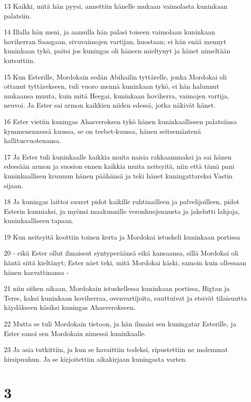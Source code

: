 \par 13 Kaikki, mitä hän pyysi, annettiin hänelle mukaan vaimolasta kuninkaan palatsiin.
\par 14 Illalla hän meni, ja aamulla hän palasi toiseen vaimolaan kuninkaan hoviherran Saasgaan, sivuvaimojen vartijan, huostaan; ei hän enää mennyt kuninkaan tykö, paitsi jos kuningas oli häneen mieltynyt ja hänet nimeltään kutsuttiin.
\par 15 Kun Esterille, Mordokain sedän Abihailin tyttärelle, jonka Mordokai oli ottanut tyttärekseen, tuli vuoro mennä kuninkaan tykö, ei hän halunnut mukaansa muuta, kuin mitä Heegai, kuninkaan hoviherra, vaimojen vartija, neuvoi. Ja Ester sai armon kaikkien niiden edessä, jotka näkivät hänet.
\par 16 Ester vietiin kuningas Ahasveroksen tykö hänen kuninkaalliseen palatsiinsa kymmenennessä kuussa, se on teebet-kuussa, hänen seitsemäntenä hallitusvuotenansa.
\par 17 Ja Ester tuli kuninkaalle kaikkia muita naisia rakkaammaksi ja sai hänen edessään armon ja suosion ennen kaikkia muita neitsyitä, niin että tämä pani kuninkaallisen kruunun hänen päähänsä ja teki hänet kuningattareksi Vastin sijaan.
\par 18 Ja kuningas laittoi suuret pidot kaikille ruhtinailleen ja palvelijoilleen, pidot Esterin kunniaksi, ja myönsi maakunnille veronhuojennusta ja jakelutti lahjoja, kuninkaalliseen tapaan.
\par 19 Kun neitsyitä koottiin toinen kerta ja Mordokai istuskeli kuninkaan portissa
\par 20 - eikä Ester ollut ilmaissut syntyperäänsä eikä kansaansa, sillä Mordokai oli häntä siitä kieltänyt; Ester näet teki, mitä Mordokai käski, samoin kuin ollessaan hänen kasvattinansa -
\par 21 niin siihen aikaan, Mordokain istuskellessa kuninkaan portissa, Bigtan ja Teres, kaksi kuninkaan hoviherraa, ovenvartijoita, suuttuivat ja etsivät tilaisuutta käydäkseen käsiksi kuningas Ahasverokseen.
\par 22 Mutta se tuli Mordokain tietoon, ja hän ilmaisi sen kuningatar Esterille, ja Ester sanoi sen Mordokain nimessä kuninkaalle.
\par 23 Ja asia tutkittiin, ja kun se havaittiin todeksi, ripustettiin ne molemmat hirsipuuhun. Ja se kirjoitettiin aikakirjaan kuningasta varten.

\chapter{3}


